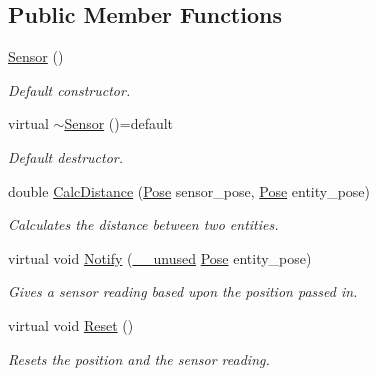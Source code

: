\subsection*{Public Member Functions}
\begin{DoxyCompactItemize}
\item 
\mbox{\label{class_sensor_a342d6d11ef572c8cba92cb76fb1a294b}} 
\mbox{\hyperlink{class_sensor_a342d6d11ef572c8cba92cb76fb1a294b}{Sensor}} ()
\begin{DoxyCompactList}\small\item\em Default constructor. \end{DoxyCompactList}\item 
\mbox{\label{class_sensor_a387919f060b66074dbd107ed1764f8f6}} 
virtual \mbox{\hyperlink{class_sensor_a387919f060b66074dbd107ed1764f8f6}{$\sim$\+Sensor}} ()=default
\begin{DoxyCompactList}\small\item\em Default destructor. \end{DoxyCompactList}\item 
double \mbox{\hyperlink{class_sensor_aab7f1f9c804ab9b05eaaa19f93b2dff7}{Calc\+Distance}} (\mbox{\hyperlink{struct_pose}{Pose}} sensor\+\_\+pose, \mbox{\hyperlink{struct_pose}{Pose}} entity\+\_\+pose)
\begin{DoxyCompactList}\small\item\em Calculates the distance between two entities. \end{DoxyCompactList}\item 
virtual void \mbox{\hyperlink{class_sensor_a8415ca43d21e24dc72481bbf1f308e5c}{Notify}} (\mbox{\hyperlink{common_8h_a2e3484535ee610c8e19e9859563abe48}{\+\_\+\+\_\+unused}} \mbox{\hyperlink{struct_pose}{Pose}} entity\+\_\+pose)
\begin{DoxyCompactList}\small\item\em Gives a sensor reading based upon the position passed in. \end{DoxyCompactList}\item 
\mbox{\label{class_sensor_a5e6ad1aa7b2c48e59851e03404dacbde}} 
virtual void \mbox{\hyperlink{class_sensor_a5e6ad1aa7b2c48e59851e03404dacbde}{Reset}} ()
\begin{DoxyCompactList}\small\item\em Resets the position and the sensor reading. \end{DoxyCompactList}\item 

\end{DoxyCompactItemize}
